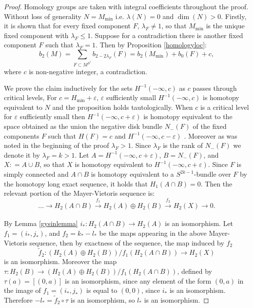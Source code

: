 \documentclass[12pt]{article}
\begin{document}
\begin{proof}
Homology groups are taken with integral coefficients throughout the proof. Without loss of generality $N=M_{\min}$ i.e. $\lambda(N) = 0$ and $\dim(N)>0$. Firstly, it is shown that for every fixed component $F$, $\lambda_{F} \neq 1$, so that $M_{\min}$ is the unique fixed component with $\lambda_{F} \leq 1$. Suppose for a contradiction there is another fixed component $F$ such that $\lambda_{F} = 1$. Then by Proposition \ref{homologyloc}: $$ b_{2}(M) =  \sum_{F \subset M^{S^1}} b_{2-2\lambda_{F}}(F) = b_{2}(M_{\min}) + b_{0}(F) + c, $$  where $c$ is non-negative integer, a contradiction.

We prove the claim inductively for the sets $H^{-1}(-\infty, c)$ as $c$ passes through critical levels, For $c = H_{\min} + \varepsilon$, $\varepsilon$ sufficiently small $H^{-1}(-\infty, c)$ is homotopy equivalent to $N$ and the proposition holds tautologically. When $c$ is a critical level for $\varepsilon$ sufficiently small then $H^{-1}(-\infty, c + \varepsilon)$ is homotopy equivalent to the space obtained as the union the negative disk bundle $N_{-}(F)$ of the fixed components $F$ such that $H(F)=c$ and $H^{-1}(-\infty, c - \varepsilon)$ \cite[Lemma 0.4]{L}. Moreover as was noted in the beginning of the proof $\lambda_{F}>1$. Since $\lambda_F$ is the rank of $N_{-}(F)$ we denote it by $\lambda_{F}=k>1$. Let $A = H^{-1}(-\infty, c + \varepsilon) $, $B = N_{-}(F)$, and $X :  =A \cup B$, so that $X$ is homotopy equivalent to  $H^{-1}(-\infty, c + \varepsilon)$. Since $F$ is simply connected and $A \cap B$ is homotopy equivalent to a $S^{2k-1}$-bundle over $F$ by the homotopy long exact sequence, it holds that $H_1(A \cap B)=0$. Then the relevant portion of the Mayer-Vietoris sequence is: $$\ldots \rightarrow H_{2}(A \cap B) \xrightarrow[]{f_1} H_{2}(A ) \oplus H_{2}(B) \xrightarrow[]{f_2} H_{2}(X) \rightarrow 0.$$

By Lemma \ref{gysinlemma} $i_{*} : H_{2}(A \cap B) \rightarrow H_{2}(A)$ is an isomorphism.  Let $f_{1} =( i_* , j_*)$,  and $f_{2} = k_* -l_*$ be the maps appearing in the above Mayer-Vietoris sequence, then by exactness of the sequence, the map induced by $f_2$  $$\tilde{f}_{2} :  (H_{2}(A ) \oplus H_{2}(B)) /f_{1}(H_{2}(A \cap B)) \rightarrow H_{2}(X) $$ is an isomorphism. Moreover the map $\tau: H_{2}(B) \rightarrow  (H_{2}(A ) \oplus H_{2}(B)) /f_{1}(H_{2}(A \cap B))$, defined by $\tau(a) = [(0,a)]$ is an isomorphism, since any element of the form $(0,a)$ in the image of $f_1 = ( i_* , j_*)$ is equal to $(0,0)$, since $i_*$ is an isomorphism. Therefore $-l_* = \tilde{f}_2 \circ \tau$ is an isomorphism, so $l_*$ is an isomorphism.
\end{proof}
\end{document}
